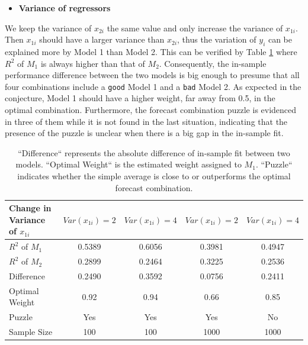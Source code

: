 \documentclass{monashthesis}
\begin{document}
\begin{itemize}
\tightlist
\item
  \bf{Variance of regressors}
\end{itemize}

We keep the variance of \(x_{2i}\) the same value and only increase the variance of \(x_{1i}\). Then \(x_{1i}\) should have a larger variance than \(x_{2i}\), thus the variation of \(y_i\) can be explained more by Model 1 than Model 2. This can be verified by Table \ref{tab:regvar} where \(R^2\) of \(M_1\) is always higher than that of \(M_2\). Consequently, the in-sample performance difference between the two models is big enough to presume that all four combinations include a \texttt{good} Model 1 and a \texttt{bad} Model 2. As expected in the conjecture, Model 1 should have a higher weight, far away from 0.5, in the optimal combination. Furthermore, the forecast combination puzzle is evidenced in three of them while it is not found in the last situation, indicating that the presence of the puzzle is unclear when there is a big gap in the in-sample fit.

\begin{table}[ht]
  \centering
    \begin{tabular}{l|cccc}
    \toprule
    Change in Variance of $x_{1i}$    &  $Var(x_{1i}) = 2$   &  $Var(x_{1i}) = 4$  &  $Var(x_{1i}) = 2$  &  $Var(x_{1i}) = 4$  \\
    \midrule
    $R^2$ of $M_1$  &    0.5389    &   0.6056   &    0.3981     &   0.4947   \\
    $R^2$ of $M_2$  &    0.2899    &   0.2464   &    0.3225     &   0.2536   \\
    Difference      &    0.2490    &   0.3592   &    0.0756     &   0.2411   \\
    Optimal Weight  &     0.92     &    0.94    &     0.66      &    0.85    \\
    Puzzle          &      Yes     &    Yes     &      Yes      &     No     \\
    Sample Size     &     100      &    100     &     1000      &    1000    \\
    \bottomrule
    \end{tabular}
  \caption{``Difference`` represents the absolute difference of in-sample fit between two models. ``Optimal Weight`` is the estimated weight assigned to $M_1$. ``Puzzle`` indicates whether the simple average is close to or outperforms the optimal forecast combination.}
  \label{tab:regvar}
\end{table}
\end{document}
